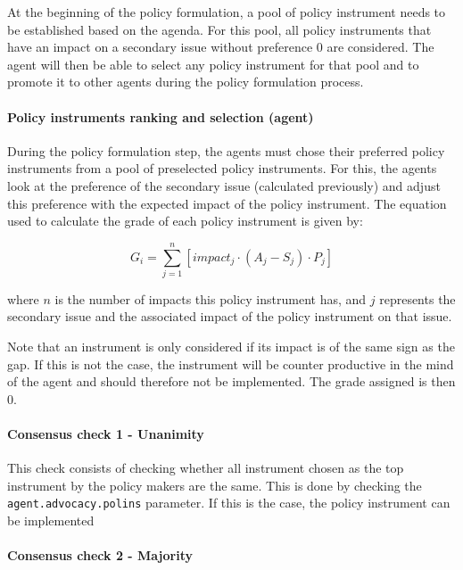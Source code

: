 At the beginning of the policy formulation, a pool of policy instrument needs to be established based on the agenda. For this pool, all policy instruments that have an impact on a secondary issue without preference 0 are considered. The agent will then be able to select any policy instrument for that pool and to promote it to other agents during the policy formulation process.

\paragraph{Policy instruments ranking and selection (agent)}

During the policy formulation step, the agents must chose their preferred policy instruments from a pool of preselected policy instruments. For this, the agents look at the preference of the secondary issue (calculated previously) and adjust this preference with the expected impact of the policy instrument. The equation used to calculate the grade of each policy instrument is given by:

\begin{equation}
G_i = \sum_{j=1}^n \left[ impact_j \cdot \left( A_j - S_j \right) \cdot P_j \right]
\end{equation}

where $n$ is the number of impacts this policy instrument has, and $j$ represents the secondary issue and the associated impact of the policy instrument on that issue.

Note that an instrument is only considered if its impact is of the same sign as the gap. If this is not the case, the instrument will be counter productive in the mind of the agent and should therefore not be implemented. The grade assigned is then 0.

\paragraph{Consensus check 1 - Unanimity}

This check consists of checking whether all instrument chosen as the top instrument by the policy makers are the same. This is done by checking the \texttt{agent.advocacy.polins} parameter. If this is the case, the policy instrument can be implemented

\paragraph{Consensus check 2 - Majority}

